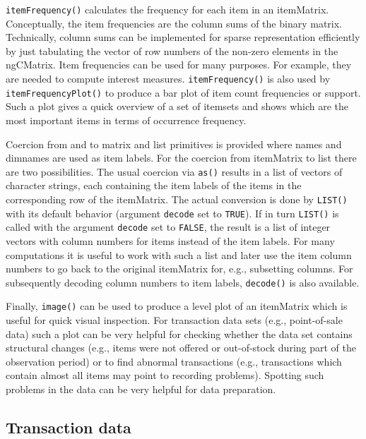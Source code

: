 \documentclass[10pt,a4paper]{article}
\newcommand{\class}[1]{\mbox{\textsf{#1}}}
\newcommand{\func}[1]{\mbox{\texttt{#1()}}}
\newcommand{\code}[1]{\mbox{\texttt{#1}}}
\begin{document}
\func{itemFrequency} calculates the frequency for each item in an
\class{itemMatrix}. Conceptually, the item frequencies are the column sums of
the binary matrix. Technically, column sums can be implemented for sparse
representation efficiently by just tabulating the vector of row numbers of the
non-zero elements in the \class{ngCMatrix}.  Item frequencies can be used for
many purposes.  For example, they are needed to compute interest measures.
\func{itemFrequency} is also used by \func{itemFrequencyPlot} to produce a bar
plot of item count frequencies or support.  Such a plot gives a quick overview
of a set of itemsets and shows which are the most important items in terms of
occurrence frequency.


Coercion from and to \class{matrix} and \class{list} primitives is
provided where names and dimnames are used as item labels.  For the
coercion from \class{itemMatrix} to \class{list} there are two
possibilities.  The usual coercion via \func{as} results in a list of
vectors of character strings, each containing the item labels of the
items in the corresponding row of the \class{itemMatrix}.  The actual
conversion is done by \func{LIST} with its default behavior (argument
\code{decode} set to \code{TRUE}).  If in turn \func{LIST} is called
with the argument \code{decode} set to \code{FALSE}, the result is a
list of integer vectors with column numbers for items instead of the
item labels. For many computations it is useful to work with such a list
and later use the item column numbers to go back to the original
\class{itemMatrix} for, e.g., subsetting columns.  For subsequently
decoding column numbers to item labels, \func{decode} is also available.

Finally, \func{image} can be used to produce a level plot of an
\class{itemMatrix} which is useful for quick visual inspection.  For
transaction data sets (e.g., point-of-sale data) such a plot can be very
helpful for checking whether the data set contains structural changes (e.g.,
items were not offered or out-of-stock during part of the observation
period) or to find abnormal transactions (e.g., transactions which
contain almost all items may point to recording problems).  Spotting
such problems in the data can be very helpful for data preparation.




\subsection{Transaction data\label{sec:transactions}}
\end{document}
